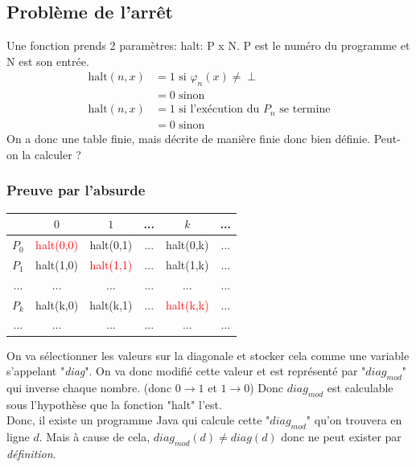 \documentclass{report}
\begin{document}
\subsection{Problème de l'arrêt}
Une fonction prends 2 paramètres: halt: P x N. P est le numéro du programme et N est son entrée.\\
\begin{align*}
\text{halt}(n,x) &= 1 \text{ si } \varphi_n(x) \neq \perp\\
&= 0 \text{ sinon}\\
\text{halt}(n,x) &= 1 \text{ si l'exécution du } P_n \text{ se termine}\\
&= 0 \text{ sinon}
\end{align*}
On a donc une table finie, mais décrite de manière finie donc bien définie. Peut-on la calculer ?

\subsubsection{Preuve par l'absurde} 

\begin{center}
\begin{tabular}{|c|c|c|c|c|c|}
\hline
& $0$ & $1$ & ... & $k$& ...\\
\hline
$P_0$ & \textcolor{red}{halt(0,0)} & halt(0,1) & ... & halt(0,k) & ...\\
\hline
$P_1$ & halt(1,0) & \textcolor{red}{halt(1,1)} & ... & halt(1,k) & ...\\
\hline
... & ... & ... & ... & ... & ... \\
\hline
$P_k$ & halt(k,0) & halt(k,1) & ... & \textcolor{red}{halt(k,k)} & ...\\
\hline
... & ... & ... & ... & ... & ... \\
\hline
\end{tabular}
\end{center}

On va sélectionner les valeurs sur la diagonale et stocker cela comme une variable s'appelant "\textit{diag}". On va donc modifié cette valeur et est représenté par "\textit{$diag_{mod}$}" qui inverse chaque nombre. (donc $0 \rightarrow 1$ et $1 \rightarrow 0$) Donc \textit{$diag_{mod}$} est calculable sous l'hypothèse que la fonction "halt" l'est.\\

Donc, il existe un programme Java qui calcule cette "$diag_{mod}$" qu'on trouvera en ligne $d$. Mais à cause de cela, $diag_{mod}(d) \neq diag(d)$ donc ne peut exister par \textit{définition}.\\
\end{document}
